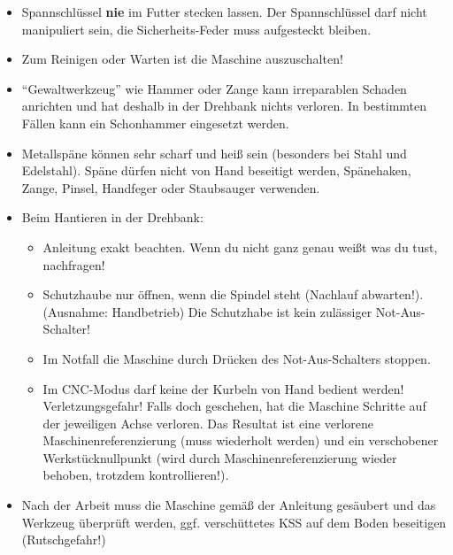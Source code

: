 \documentclass{\basedir/fablab-document}
\begin{document}
\begin{itemize}
 \item Spannschlüssel \textbf{nie} im Futter stecken lassen. Der Spannschlüssel darf nicht manipuliert sein, die Sicherheits-Feder muss aufgesteckt bleiben. %
 \item Zum Reinigen oder Warten ist die Maschine auszuschalten!
 \item \enquote{Gewaltwerkzeug} wie Hammer oder Zange kann irreparablen Schaden anrichten und hat deshalb in der Drehbank nichts verloren. In bestimmten Fällen kann ein Schonhammer eingesetzt werden. %
 \item Metallspäne können sehr scharf und heiß sein (besonders bei Stahl und Edelstahl). Späne dürfen nicht von Hand beseitigt werden, Spänehaken, Zange, Pinsel, Handfeger oder Staubsauger verwenden. %

 \item Beim Hantieren in der Drehbank:
\begin{itemize}
 \item Anleitung exakt beachten. Wenn du nicht ganz genau weißt was du tust, nachfragen!
 \item Schutzhaube nur öffnen, wenn die Spindel steht (Nachlauf abwarten!). (Ausnahme: Handbetrieb) Die Schutzhabe ist kein zulässiger Not-Aus-Schalter!
\item Im Notfall die Maschine durch Drücken des Not-Aus-Schalters stoppen.
\item Im CNC-Modus darf keine der Kurbeln von Hand bedient werden! Verletzungsgefahr! Falls doch geschehen, hat die Maschine Schritte auf der jeweiligen Achse verloren. Das Resultat ist eine verlorene Maschinenreferenzierung (muss wiederholt werden) und ein verschobener Werkstücknullpunkt (wird durch Maschinenreferenzierung wieder behoben, trotzdem kontrollieren!).
\end{itemize}
\item Nach der Arbeit muss die Maschine gemäß der Anleitung gesäubert und das Werkzeug überprüft werden, ggf. verschüttetes KSS auf dem Boden beseitigen (Rutschgefahr!)

\end{itemize}
\end{document}
